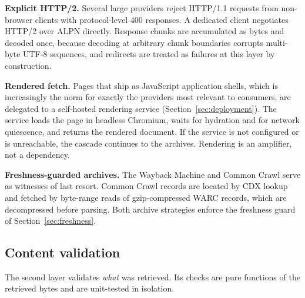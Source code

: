 \documentclass[11pt]{article}
\begin{document}
\textbf{Explicit HTTP/2.} Several large providers reject HTTP/1.1 requests from
non-browser clients with protocol-level 400 responses. A dedicated client
negotiates HTTP/2 over ALPN directly. Response chunks are accumulated as bytes
and decoded once, because decoding at arbitrary chunk boundaries corrupts
multi-byte UTF-8 sequences, and redirects are treated as failures at this layer
by construction.

\textbf{Rendered fetch.} Pages that ship as JavaScript application shells, which
is increasingly the norm for exactly the providers most relevant to consumers,
are delegated to a self-hosted rendering service (Section~\ref{sec:deployment}).
The service loads the page in headless Chromium, waits for hydration and for
network quiescence, and returns the rendered document. If the service is not
configured or is unreachable, the cascade continues to the archives. Rendering
is an amplifier, not a dependency.

\textbf{Freshness-guarded archives.} The Wayback Machine \cite{wayback} and
Common Crawl \cite{commoncrawl} serve as witnesses of last resort. Common Crawl
records are located by CDX lookup and fetched by byte-range reads of
gzip-compressed WARC records, which are decompressed before parsing. Both archive
strategies enforce the freshness guard of Section~\ref{sec:freshness}.

\subsection{Content validation}
\label{sec:validation}
The second layer validates \emph{what} was retrieved. Its checks are pure
functions of the retrieved bytes and are unit-tested in isolation.
\end{document}
